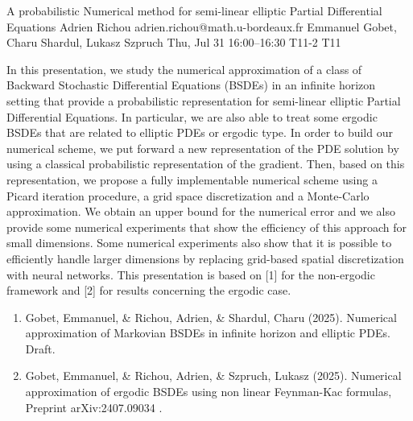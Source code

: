 \documentclass[12pt,lettersize,oneside]{book} %
\begin{document}
\begin{talk}
  {A probabilistic Numerical method for semi-linear elliptic Partial Differential Equations}%
  {Adrien Richou}%
  {adrien.richou@math.u-bordeaux.fr}%
  {Emmanuel Gobet, Charu Shardul, Lukasz Szpruch}%
  {}%
  {}%
  {Thu, Jul 31 16:00--16:30}%
  {T11-2}%
  {T11}%
  
    
   
In this presentation, we study the numerical approximation of a class of Backward Stochastic Differential Equations (BSDEs) in an infinite horizon setting that provide a probabilistic representation for semi-linear elliptic Partial Differential Equations. In particular, we are also able to treat some ergodic BSDEs that are related to elliptic PDEs or ergodic type. In order to build our numerical scheme, we put forward a new representation of the PDE solution by using a classical probabilistic representation of the gradient. Then, based on this representation, we propose a fully implementable numerical scheme using a Picard iteration procedure, a grid space discretization and a Monte-Carlo approximation. We obtain an upper bound for the numerical error and we also provide some numerical experiments that show the
efficiency of this approach for small dimensions. Some numerical experiments also show that it is possible to efficiently handle larger dimensions by replacing grid-based spatial discretization with neural networks. This presentation is based on [1] for the non-ergodic framework and [2] for results concerning the ergodic case.

\medskip

\begin{enumerate}
 \item[{[1]}] Gobet, Emmanuel, \& Richou, Adrien, \& Shardul, Charu (2025). Numerical approximation of Markovian BSDEs in infinite
  horizon and elliptic PDEs. Draft.
 \item[{[2]}] Gobet, Emmanuel, \& Richou, Adrien, \& Szpruch, Lukasz (2025).  Numerical approximation of ergodic BSDEs using non
  linear Feynman-Kac formulas, Preprint arXiv:2407.09034 .
\end{enumerate}

\end{talk}
\end{document}
